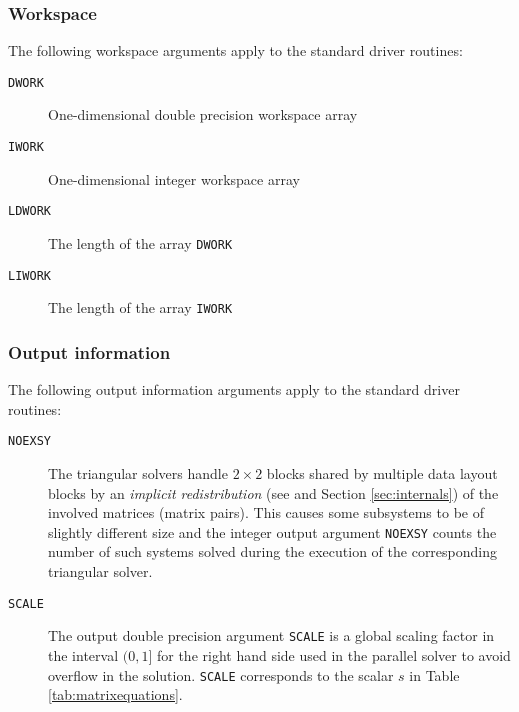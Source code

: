 \documentclass[11pt]{article}
\begin{document}
\subsubsection{Workspace}
The following workspace arguments apply to the standard driver
routines:
\begin{description}
\item[\texttt{DWORK}] One-dimensional double precision workspace
array \item[\texttt{IWORK}] One-dimensional integer workspace
array \item[\texttt{LDWORK}] The length of the array
\texttt{DWORK} \item[\texttt{LIWORK}] The length of the array
\texttt{IWORK}
\end{description}

\subsubsection{Output information}
The following output information arguments apply to the standard
driver routines:
\begin{description}
\item[\texttt{NOEXSY}] The triangular solvers handle $2 \times 2$
blocks shared by multiple data layout blocks by an {\em implicit
redistribution} (see \cite{granatkagstromporomaa03,granatkagstrom07b} and Section \ref{sec:internals}) of the involved
matrices (matrix pairs). This causes some subsystems to be of
slightly different size and the integer output argument
\texttt{NOEXSY} counts the number of such systems solved during
the execution of the corresponding triangular solver.

\item[\texttt{SCALE}] The output double precision argument
\texttt{SCALE} is a global scaling factor in the interval $(0,1]$
for the right hand side used in the parallel solver to avoid
overflow in the solution. \texttt{SCALE} corresponds to the scalar
$s$ in Table \ref{tab:matrixequations}.
\end{description}
\end{document}
